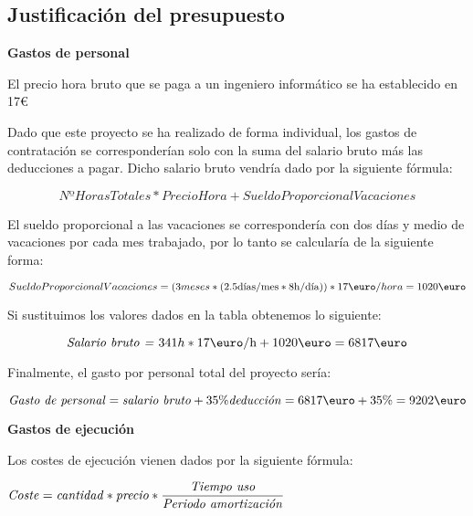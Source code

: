 \newpage

\subsection{Justificación del presupuesto}

\textbf{Gastos de personal}

El precio hora bruto que se paga a un ingeniero informático se ha establecido en 17\euro

Dado que este proyecto se ha realizado de forma individual, los gastos de contratación se corresponderían solo con la suma del salario bruto más las deducciones a pagar. Dicho salario bruto vendría dado por la siguiente fórmula:

\vspace{-0.7cm}

\[
NºHorasTotales * PrecioHora + SueldoProporcionalVacaciones
\]

El sueldo proporcional a las vacaciones se correspondería con dos días y medio de vacaciones por cada mes trabajado, por lo tanto se calcularía de la siguiente forma:

\vspace{-1cm}

\[
SueldoProporcionalVacaciones =  (3 meses * (2.5 \text{días/mes} *  \text{8h/día})) *17 \text{\euro}/hora = 1020 \text{\euro}
\]

\vspace{-0.3cm}

Si sustituimos los valores dados en la tabla obtenemos lo siguiente:

\vspace{-0.7cm}

\[
\text{\textit{Salario bruto =} }341h*17\text{\euro/h}+1020\text{\euro} = 6817\text{\euro}
\]

Finalmente, el gasto por personal total del proyecto sería:

\vspace{-0.7cm}

\[
\text{\textit{Gasto de personal}} = \text{\textit{salario bruto}} + 35\text{\%} \text{\textit{deducción}} = 6817\text{\euro} + 35\text{\%} = 9202\text{\euro}
\]

\textbf{Gastos de ejecución}

Los costes de ejecución vienen dados por la siguiente fórmula:

$\text{\textit{Coste}} = \text{\textit{cantidad}} * \text{\textit{precio}} * \dfrac{\text{\textit{Tiempo uso}}}{\text{\textit{Periodo amortización}}}$

